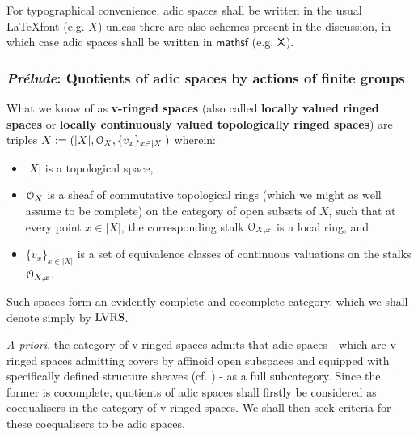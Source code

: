         \begin{convention}
            For typographical convenience, adic spaces shall be written in the usual \LaTeX font (e.g. $X$) unless there are also schemes present in the discussion, in which case adic spaces shall be written in $\mathsf{mathsf}$ (e.g. $\mathsf{X}$).
        \end{convention}
        
        \subsubsection{\textit{Pr\'elude}: Quotients of adic spaces by actions of finite groups}
            \begin{convention} \label{conv: locally_valued_ringed_spaces}
                What we know of as \textbf{v-ringed spaces} (also called \textbf{locally valued ringed spaces} or \textbf{locally continuously valued topologically ringed spaces}) are triples $X := (|X|, \mathcal{O}_X, \{v_x\}_{x \in |X|})$ wherein:
                    \begin{itemize}
                        \item $|X|$ is a topological space,
                        \item $\mathcal{O}_X$ is a sheaf of commutative topological rings (which we might as well assume to be complete) on the category of open subsets of $X$, such that at every point $x \in |X|$, the corresponding stalk $\mathcal{O}_{X, x}$ is a local ring, and
                        \item $\{v_x\}_{x \in |X|}$ is a set of equivalence classes of continuous valuations on the stalks $\mathcal{O}_{X, x}$.
                    \end{itemize}
                Such spaces form an evidently complete and cocomplete category, which we shall denote simply by $\mathrm{LVRS}$.
            \end{convention}
            \begin{remark}
                \textit{A priori}, the category of v-ringed spaces admits that adic spaces - which are v-ringed spaces admitting covers by affinoid open subspaces and equipped with specifically defined structure sheaves (cf. \cite[Definition 3.1.6]{scholze_weinstein_2020_berkeley_lectures_on_p_adic_geometry}) - as a full subcategory. Since the former is cocomplete, quotients of adic spaces shall firstly be considered as coequalisers in the category of v-ringed spaces. We shall then seek criteria for these coequalisers to be adic spaces. 
            \end{remark}
